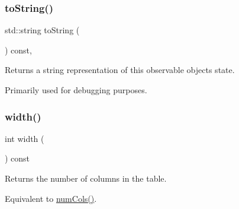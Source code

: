 \subsubsection{\texorpdfstring{to\+String()}{toString()}}
{\footnotesize\ttfamily std\+::string to\+String (\begin{DoxyParamCaption}{ }\end{DoxyParamCaption}) const\hspace{0.3cm}{\ttfamily [virtual]}, {\ttfamily [inherited]}}



Returns a string representation of this observable object\textquotesingle{}s state. 

Primarily used for debugging purposes. \mbox{\label{classsgl_1_1GTable_ad72663daf610f2a0833a2fc3d78e4fdf}} 
\subsubsection{\texorpdfstring{width()}{width()}}
{\footnotesize\ttfamily int width (\begin{DoxyParamCaption}{ }\end{DoxyParamCaption}) const\hspace{0.3cm}{\ttfamily [virtual]}}



Returns the number of columns in the table. 

Equivalent to \mbox{\hyperlink{classsgl_1_1GTable_a5997e103e56aae1db12e1f7f02e136c5}{num\+Cols()}}. 